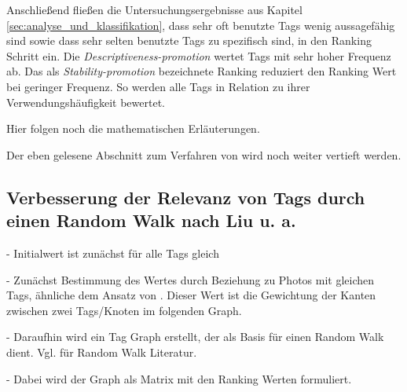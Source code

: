 Anschließend fließen die Untersuchungsergebnisse aus Kapitel \ref{sec:analyse_und_klassifikation}, dass sehr oft benutzte Tags wenig aussagefähig sind sowie dass sehr selten benutzte Tags zu spezifisch sind, in den Ranking Schritt ein. Die \emph{Descriptiveness-promotion} wertet Tags mit sehr hoher Frequenz ab. Das als \emph{Stability-promotion} bezeichnete Ranking reduziert den Ranking Wert bei geringer Frequenz. So werden alle Tags in Relation zu ihrer Verwendungshäufigkeit bewertet.

Hier folgen noch die mathematischen Erläuterungen.

Der eben gelesene Abschnitt zum Verfahren von \cite{collectiveKnowledge} wird noch weiter vertieft werden.


\subsection{Verbesserung der Relevanz von Tags durch einen Random Walk nach Liu u. a.} %
\label{sub:verbesserung_der_relevanz_durch_einen_random_walk}

%     

- Initialwert ist zunächst für alle Tags gleich

- Zunächst Bestimmung des Wertes durch Beziehung zu Photos mit gleichen Tags, ähnliche dem Ansatz von \cite{collectiveKnowledge}. Dieser Wert ist die Gewichtung der Kanten zwischen zwei Tags/Knoten im folgenden Graph.

- Daraufhin wird ein Tag Graph erstellt, der als Basis für einen Random Walk dient. Vgl. \cite{} für Random Walk Literatur. 

- Dabei wird der Graph als Matrix mit den Ranking Werten formuliert. 

